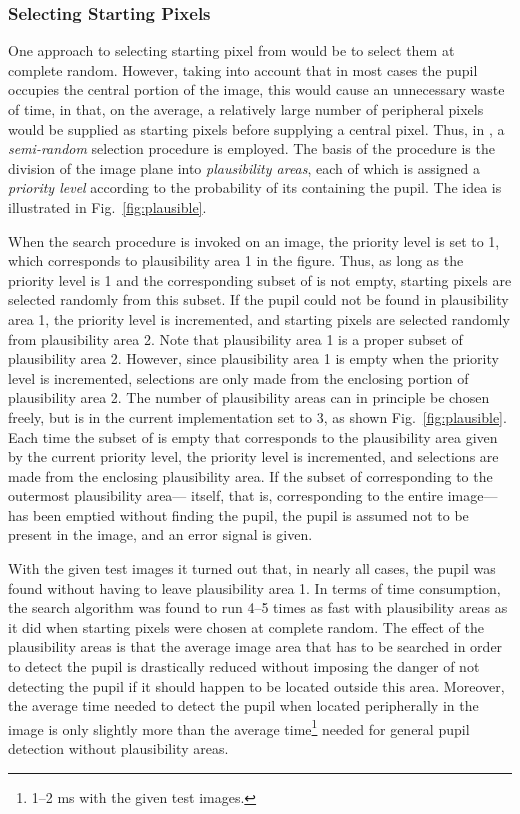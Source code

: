 \subsubsection{Selecting Starting Pixels}

One approach to selecting starting pixel from {\SS} would be to select
them at complete random.  However, taking into account that in most
cases the pupil occupies the central portion of the image, this would
cause an unnecessary waste of time, in that, on the average, a
relatively large number of peripheral pixels would be supplied as
starting pixels before supplying a central pixel.  Thus, in
{\octopus}, a {\em semi-random\/} selection procedure is employed.
The basis of the procedure is the division of the image plane into
{\em plausibility areas\/}, each of which is assigned a {\em priority
  level\/} according to the probability of its containing the pupil.
The idea is illustrated in Fig.~\ref{fig:plausible}.  

When the search procedure is invoked on an image, the priority level
is set to 1, which corresponds to plausibility area 1 in the figure.
Thus, as long as the priority level is 1 and the corresponding subset
of {\SS} is not empty, starting pixels are selected randomly from this
subset.  If the pupil could not be found in plausibility area 1, the
priority level is incremented, and starting pixels are selected
randomly from plausibility area 2.  Note that plausibility area 1 is a
proper subset of plausibility area 2.  However, since plausibility
area 1 is empty when the priority level is incremented, selections are
only made from the enclosing portion of plausibility area 2.  The
number of plausibility areas can in principle be chosen freely, but is
in the current implementation set to 3, as shown
Fig.~\ref{fig:plausible}.  Each time the subset of {\SS} is empty that
corresponds to the plausibility area given by the current priority
level, the priority level is incremented, and selections are made from
the enclosing plausibility area.  If the subset of {\SS} corresponding
to the outermost plausibility area---{\SS} itself, that is,
corresponding to the entire image---has been emptied without finding
the pupil, the pupil is assumed not to be present in the image, and an
error signal is given.

With the given test images it turned out that, in nearly all cases,
the pupil was found without having to leave plausibility area 1.  In
terms of time consumption, the search algorithm was found to run 4--5
times as fast with plausibility areas as it did when starting pixels
were chosen at complete random.  The effect of the plausibility areas
is that the average image area that has to be searched in order to
detect the pupil is drastically reduced without imposing the danger of
not detecting the pupil if it should happen to be located outside this
area.  Moreover, the average time needed to detect the pupil when
located peripherally in the image is only slightly more than the
average time\footnote{1--2 ms with the given test images.} needed for
general pupil detection without plausibility areas.

